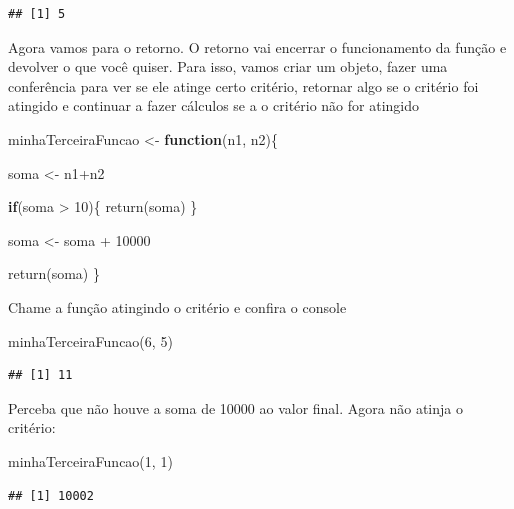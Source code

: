 \documentclass[
]{book}
\newenvironment{Shaded}{\begin{snugshade}}{\end{snugshade}}
\newcommand{\ControlFlowTok}[1]{\textcolor[rgb]{0.13,0.29,0.53}{\textbf{#1}}}
\newcommand{\DecValTok}[1]{\textcolor[rgb]{0.00,0.00,0.81}{#1}}
\newcommand{\FunctionTok}[1]{\textcolor[rgb]{0.00,0.00,0.00}{#1}}
\newcommand{\NormalTok}[1]{#1}
\newcommand{\OtherTok}[1]{\textcolor[rgb]{0.56,0.35,0.01}{#1}}
\newcommand{\SpecialCharTok}[1]{\textcolor[rgb]{0.00,0.00,0.00}{#1}}
\begin{document}
\begin{verbatim}
## [1] 5
\end{verbatim}

Agora vamos para o retorno. O retorno vai encerrar o funcionamento da função e devolver o que você quiser. Para isso, vamos criar um objeto, fazer uma conferência para ver se ele atinge certo critério, retornar algo se o critério foi atingido e continuar a fazer cálculos se a o critério não for atingido

\begin{Shaded}
\begin{Highlighting}[]
\NormalTok{minhaTerceiraFuncao }\OtherTok{\textless{}{-}} \ControlFlowTok{function}\NormalTok{(n1, n2)\{ }

\NormalTok{  soma }\OtherTok{\textless{}{-}}\NormalTok{ n1}\SpecialCharTok{+}\NormalTok{n2}
  
  \ControlFlowTok{if}\NormalTok{(soma }\SpecialCharTok{\textgreater{}} \DecValTok{10}\NormalTok{)\{}
    \FunctionTok{return}\NormalTok{(soma)}
\NormalTok{  \}}
  
\NormalTok{  soma }\OtherTok{\textless{}{-}}\NormalTok{ soma }\SpecialCharTok{+} \DecValTok{10000}
  
  \FunctionTok{return}\NormalTok{(soma)}
\NormalTok{\}}
\end{Highlighting}
\end{Shaded}

Chame a função atingindo o critério e confira o console

\begin{Shaded}
\begin{Highlighting}[]
\FunctionTok{minhaTerceiraFuncao}\NormalTok{(}\DecValTok{6}\NormalTok{, }\DecValTok{5}\NormalTok{)}
\end{Highlighting}
\end{Shaded}

\begin{verbatim}
## [1] 11
\end{verbatim}

Perceba que não houve a soma de 10000 ao valor final. Agora não atinja o critério:

\begin{Shaded}
\begin{Highlighting}[]
\FunctionTok{minhaTerceiraFuncao}\NormalTok{(}\DecValTok{1}\NormalTok{, }\DecValTok{1}\NormalTok{)}
\end{Highlighting}
\end{Shaded}

\begin{verbatim}
## [1] 10002
\end{verbatim}
\end{document}

